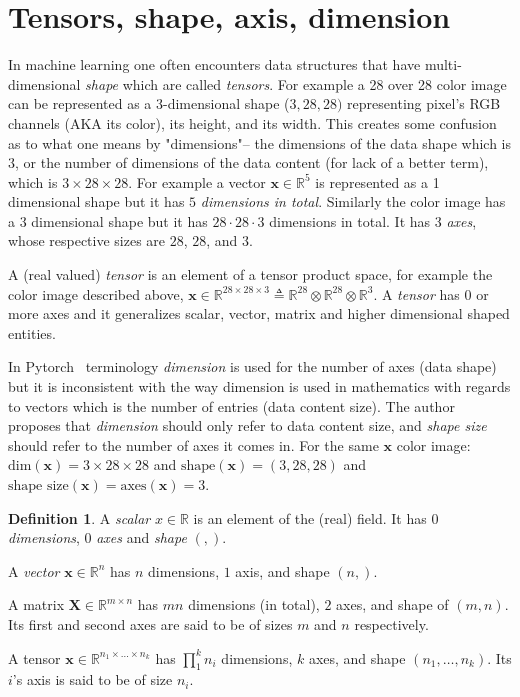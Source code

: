 \documentclass[11pt, a4paper]{report}
\theoremstyle{plain}
\theoremstyle{definition}
\newtheorem{mydef}{Definition}[chapter]
\theoremstyle{remark}
\newcommand{\R}{\mathbb{R}}
\newcommand{\X}{\mathbf{X}}
\newcommand{\x}{\mathbf{x}}
\begin{document}

\section{Tensors, shape, axis, dimension}
In machine learning one often encounters data structures that have
multi-dimensional \emph{shape} which are called \emph{tensors}. For example a 28
over 28 color image can be represented as a 3-dimensional shape ($3,28, 28)$
representing pixel's RGB channels (AKA its color), its height, and its
width. This creates some
confusion as to what one means by "dimensions"-- the dimensions of the data shape
which is $3$,
or the number of dimensions of the data content (for lack of a better term),
which is  $3 \times 28 \times 28$. For example a vector $\x \in \R^5$
is represented as a 1 dimensional shape but it has $5$ \emph{dimensions in
total}. Similarly the color image has a $3$ dimensional shape but it has $28
\cdot 28 \cdot 3$ dimensions in total. It has 3 \emph{axes}, whose respective
sizes are $28$, $28$, and $3$. 

A (real valued) \emph{tensor} is an element of a tensor product space, for
example the color image described above, $\x \in  \R^{28 \times 28 \times 3}
\triangleq \R^{28} \otimes \R^{28} \otimes \R^3$. A \emph{tensor} has $0$ or
more axes and it generalizes scalar, vector, matrix and higher dimensional
shaped entities.

In Pytorch~\cite{pytorch2018pytorch} terminology \emph{dimension} is used for the
number of axes (data shape) but it is inconsistent with the way dimension is used in
mathematics with regards to vectors which is the number of entries (data
content size). 
The author proposes that \emph{dimension} should only refer to data content size,  
and \emph{shape size} should refer to the number of axes it comes in. For the same $\x$ color
image: $\text{dim}(\x) = 3 \times 28 \times 28$ and $\text{shape}(\x) =
(3,28,28)$ and $\text{shape size}(\x) = \text{axes}(\x) = 3$.

\begin{mydef}
\label{def:tensor}
A \emph{scalar} $x \in \R$ is an element of the (real) field. It has $0$
\emph{dimensions}, $0$ \emph{axes} and \emph{shape} $(,)$.

A \emph{vector} $\x \in \R^n$ has $n$ dimensions, $1$ axis, and shape $(n,)$.

A matrix $\X \in \R^{m \times n}$ has $mn$ dimensions (in total), $2$ axes, and
shape of $(m,n)$. Its first and second axes are said to be of sizes $m$ and $n$
respectively.

A tensor $\x \in \R^{n_1 \times \dots \times n_k}$ has $\prod_1^k n_i$
dimensions, $k$ axes, and shape $(n_1, \dots, n_k)$. Its $i$'s axis is said to
be of size $n_i$.
\end{mydef}
\end{document}
